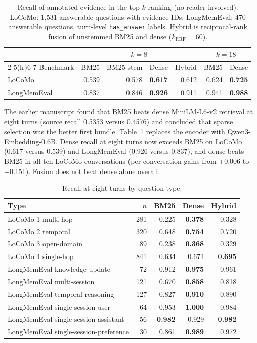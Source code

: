 \documentclass[11pt]{article}
\begin{document}
\begin{table}[t]
\centering
\caption{Recall of annotated evidence in the top-$k$ ranking (no reader
involved). LoCoMo: 1,531 answerable questions with evidence IDs; LongMemEval:
470 answerable questions, turn-level \texttt{has\_answer} labels. Hybrid is
reciprocal-rank fusion of unstemmed BM25 and dense ($k_{\mathrm{RRF}}=60$).}
\label{tab:retrieval}
\small
\begin{tabular}{lrrrrrr}
\toprule
 & \multicolumn{4}{c}{$k=8$} & \multicolumn{2}{c}{$k=18$} \\
\cmidrule(lr){2-5}\cmidrule(lr){6-7}
Benchmark & BM25 & BM25-stem & Dense & Hybrid & BM25 & Dense \\
\midrule
LoCoMo & 0.539 & 0.578 & \textbf{0.617} & 0.612 & 0.624 & \textbf{0.725} \\
LongMemEval & 0.837 & 0.846 & \textbf{0.926} & 0.911 & 0.941 & \textbf{0.988} \\
\bottomrule
\end{tabular}
\end{table}

The earlier manuscript found that BM25 beats dense MiniLM-L6-v2 retrieval at
eight turns (source recall 0.5353 versus 0.4576) and concluded that sparse
selection was the better first bundle. Table~\ref{tab:retrieval} replaces the
encoder with Qwen3-Embedding-0.6B. Dense recall at eight turns now exceeds
BM25 on LoCoMo (0.617 versus 0.539) and LongMemEval (0.926 versus 0.837), and
dense beats BM25 in all ten LoCoMo conversations (per-conversation gains
from +0.006 to +0.151). Fusion does not beat dense alone overall.

\begin{table}[t]
\centering
\caption{Recall at eight turns by question type.}
\label{tab:retrieval-type}
\small
\begin{tabular}{lrrrr}
\toprule
Type & $n$ & BM25 & Dense & Hybrid \\
\midrule
LoCoMo 1 multi-hop & 281 & 0.225 & \textbf{0.378} & 0.328 \\
LoCoMo 2 temporal & 320 & 0.648 & \textbf{0.754} & 0.720 \\
LoCoMo 3 open-domain & 89 & 0.238 & \textbf{0.368} & 0.329 \\
LoCoMo 4 single-hop & 841 & 0.634 & 0.671 & \textbf{0.695} \\
\midrule
LongMemEval knowledge-update & 72 & 0.912 & \textbf{0.975} & 0.961 \\
LongMemEval multi-session & 121 & 0.670 & \textbf{0.858} & 0.818 \\
LongMemEval temporal-reasoning & 127 & 0.827 & \textbf{0.910} & 0.890 \\
LongMemEval single-session-user & 64 & 0.953 & \textbf{1.000} & 0.984 \\
LongMemEval single-session-assistant & 56 & \textbf{0.982} & 0.929 & \textbf{0.982} \\
LongMemEval single-session-preference & 30 & 0.861 & \textbf{0.989} & 0.972 \\
\bottomrule
\end{tabular}
\end{table}
\end{document}
